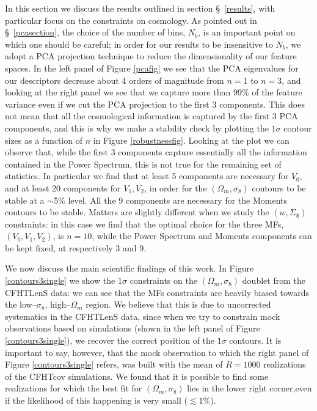 \documentclass[reprint,aps,prd,superscriptaddress,showkeys,showpacs]{revtex4-1}
\begin{document}
In this section we discuss the results outlined in section \S~\ref{results}, with particular focus on the constraints on cosmology. As pointed out in \S~\ref{pcasection}, the choice of the number of bins, $N_b$, is an important point on which one should be careful; in order for our results to be insensitive to $N_b$, we adopt a PCA projection technique to reduce the dimensionality of our feature spaces. In the left panel of Figure \ref{pcafig} we see that the PCA eigenvalues for our descriptors decrease about 4 orders of magnitude from $n=1$ to $n=3$, and looking at the right panel we see that we capture more than 99\% of the feature variance even if we cut the PCA projection to the first 3 components. This does not mean that all the cosmological information is captured by the first 3 PCA components, and this is why we make a stability check by plotting the $1\sigma$ contour sizes as a function of $n$ in Figure \ref{robustnessfig}. Looking at the plot we can observe that, while the first 3 components capture essentially all the information contained in the Power Spectrum, this is not true for the remaining set of statistics. In particular we find that at least 5 components are necessary for $V_0$, and at least 20 components for $V_1,V_2$, in order for the $(\Omega_m,\sigma_8)$ contours to be stable at a $\sim$5\% level. All the 9 components are necessary for the Moments contours to be stable. Matters are slightly different when we study the $(w,\Sigma_8)$ constraints: in this case we find that the optimal choice for the three MFs, $(V_0,V_1,V_2)$, is $n=10$, while the Power Spectrum and Moments components can be kept fixed, at respectively 3 and 9. 

We now discuss the main scientific findings of this work. In Figure \ref{contours3single} we show the $1\sigma$ constraints on the $(\Omega_m,\sigma_8)$ doublet from the CFHTLenS data: we can see that the MFs constraints are heavily biased towards the low--$\sigma_8$, high--$\Omega_m$ region. We believe that this is due to uncorrected systematics in the CFHTLenS data, since when we try to constrain mock observations based on simulations (shown in the left panel of Figure \ref{contours3single}), we recover the correct position of the $1\sigma$ contours. It is important to say, however, that the mock observation to which the right panel of Figure \ref{contours3single} refers, was built with the mean of $R=1000$ realizations of the CFHTcov simulations. We found that it is possible to find some realizations for which the best fit for $(\Omega_m,\sigma_8)$ lies in the lower right corner,even if the likelihood of this happening is very small ($\lesssim1\%$). 
\end{document}

